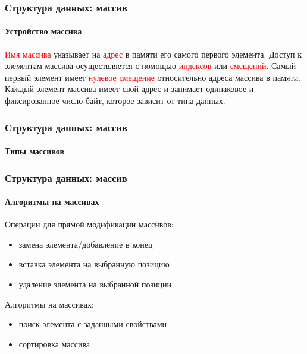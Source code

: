 \documentclass[aspectratio=169]{beamer}
\begin{document}
\begin{frame}
\frametitle{Структура данных: массив}
\framesubtitle{Устройство массива}
\justifying
\small
\textcolor{red}{Имя массива} указывает на \textcolor{red}{адрес} в памяти его самого первого элемента. \newline\newline Доступ к элементам массива осуществляется с помощью \textcolor{red}{индексов} или \textcolor{red}{смещений}. \newline\newline
Самый первый элемент имеет \textcolor{red}{нулевое смещение} относительно адреса массива в памяти.\newline\newline
Каждый элемент массива имеет свой адрес и занимает одинаковое и фиксированное число байт, которое зависит от типа данных.

\begin{figure}
    \captionsetup[subfigure]{labelformat=empty}
    \centering
\end{figure}
\end{frame}

\begin{frame}
\frametitle{Структура данных: массив}
\framesubtitle{Типы массивов}
\justifying
\small
\begin{figure}
    \captionsetup[subfigure]{labelformat=empty}
    \centering
\end{figure}
\end{frame}

\begin{frame}
\frametitle{Структура данных: массив}
\framesubtitle{Алгоритмы на массивах}
\justifying
\small
Операции для прямой модификации массивов:
\begin{itemize}
  \item{замена элемента/добавление в конец}
  \item{вставка элемента на выбранную позицию}
  \item{удаление элемента на выбранной позиции\newline}
\end{itemize}

Алгоритмы на массивах:
\begin{itemize}
  \item{поиск элемента с заданными свойствами}
  \item{сортировка массива}
\end{itemize}
\end{frame}
\end{document}
